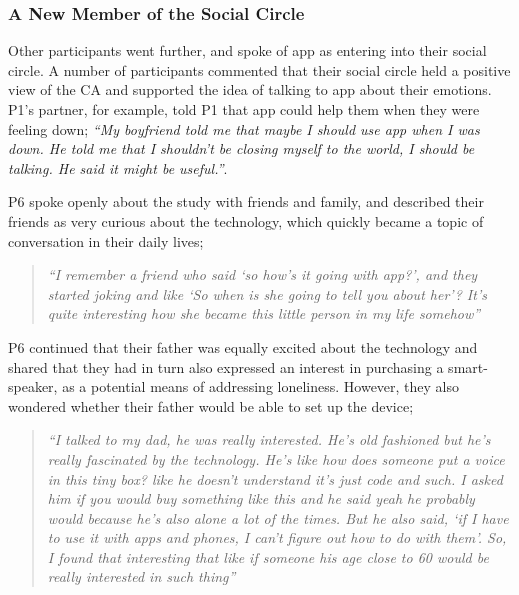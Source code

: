         \subsubsection{A New Member of the Social Circle} %
        
            Other participants went further, and spoke of \acl{app} as entering into their social circle. A number of participants commented that their social circle held a positive view of the \ac{CA} and supported the idea of talking to \ac{app} about their emotions. P1's partner, for example, told P1 that \ac{app} could help them when they were feeling down; \textit{``My boyfriend told me that maybe I should use \acl{app} when I was down. He told me that I shouldn’t be closing myself to the world, I should be talking. He said it might be useful.''}. 
            
            P6 spoke openly about the study with friends and family, and described their friends as very curious about the technology, which quickly became a topic of conversation in their daily lives;
            
                \begin{quote}
                \vspace{2mm}
                    \textit{``I remember a friend who said `so how's it going with \acl{app}?', and they started joking and like `So when is she going to tell you about her'? It's quite interesting how she became this little person in my life somehow''} %
                \vspace{2mm}
                \end{quote} 
            
            P6 continued that their father was equally excited about the technology and shared that they had in turn also expressed an interest in purchasing a smart-speaker, as a potential means of addressing loneliness. However, they also wondered whether their father would be able to set up the device;
            
                \begin{quote}
                \vspace{2mm}
                    \textit{``I talked to my dad, he was really interested. He's old fashioned but he's really fascinated by the technology. He's like how does someone put a voice in this tiny box? like he doesn't understand it's just code and such. I asked him if you would buy something like this and he said yeah he probably would because he's also alone a lot of the times. But he also said, `if I have to use it with apps and phones, I can't figure out how to do with them'. So, I found that interesting that like if someone his age close to 60 would be really interested in such thing''} %
                \vspace{2mm}
                \end{quote} 
            
